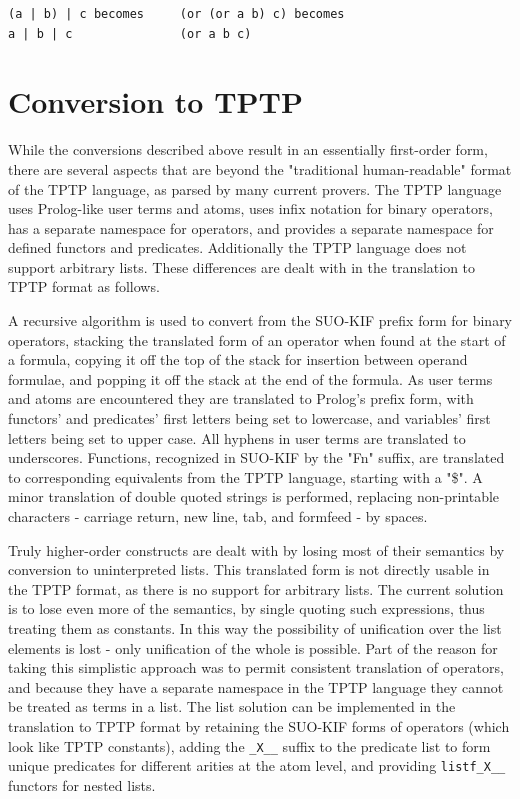 \documentclass{book}
\begin{document}
\begin{verbatim}
(a | b) | c becomes     (or (or a b) c) becomes
a | b | c               (or a b c)
\end{verbatim}



\section{Conversion to TPTP}
\label{chap:SUMOInfe:sec:Conv}

While the conversions described above result in an essentially first-order form,
there are several aspects that are beyond the "traditional human-readable"
format of the TPTP language, as parsed by many current provers. The TPTP
language uses Prolog-like user terms and atoms, uses infix
notation for binary operators, has a separate namespace for operators, and
provides a separate namespace for defined functors and predicates. Additionally
the TPTP language does not support arbitrary lists. These differences are dealt
with in the translation to TPTP format as follows.

A recursive algorithm is used to convert from the SUO-KIF prefix form for binary
operators, stacking the translated form of an operator when found at the start
of a formula, copying it off the top of the stack for insertion between operand
formulae, and popping it off the stack at the end of the formula. As user terms
and atoms are encountered they are translated to Prolog’s prefix form, with
functors’ and predicates’ first letters being set to lowercase, and
variables’ first letters being set to upper case. All hyphens in user terms
are translated to underscores. Functions, recognized in SUO-KIF by the "Fn"
suffix, are translated to corresponding equivalents from the TPTP language,
starting with a "\$". A minor translation of double quoted strings is
performed, replacing non-printable characters - carriage return, new line, tab,
and formfeed - by spaces.

Truly higher-order
constructs are dealt with by losing most of their semantics by conversion to
uninterpreted lists. This translated form is not directly usable in the TPTP
format, as there is no support for arbitrary lists. The current solution is to
lose even more of the semantics, by single quoting such expressions, thus
treating them as constants. In this way the possibility of unification over the
list elements is lost - only unification of the whole is possible. Part of the
reason for taking this simplistic approach was to permit consistent translation
of operators, and because they have a separate namespace in the TPTP language
they cannot be treated as terms in a list. The list solution can be implemented
in the translation to TPTP format by retaining the SUO-KIF forms of operators
(which look like TPTP constants), adding the {\tt \_X\_\_} suffix to the
predicate list to form unique predicates for different arities at the atom
level, and providing {\tt listf\_X\_\_} functors for nested lists.
\end{document}
